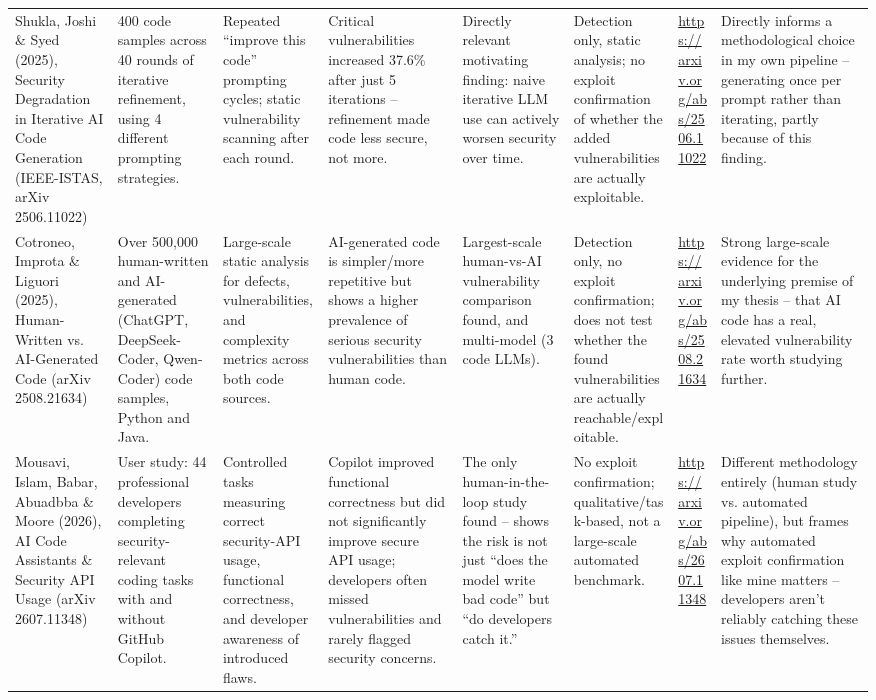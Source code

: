 \documentclass[10pt]{article}
\begin{document}
\begin{landscape}
\begin{longtable}{
  P{2.6cm}
  P{3.6cm}
  P{3.2cm}
  P{4.0cm}
  P{3.0cm}
  P{3.0cm}
  P{2.2cm}
  P{3.6cm}
}
Shukla, Joshi \& Syed (2025), Security Degradation in Iterative AI Code Generation (IEEE-ISTAS, arXiv 2506.11022)
&
400 code samples across 40 rounds of iterative refinement, using 4 different prompting strategies.
&
Repeated ``improve this code'' prompting cycles; static vulnerability scanning after each round.
&
Critical vulnerabilities increased 37.6\% after just 5 iterations -- refinement made code less secure, not more.
&
Directly relevant motivating finding: naive iterative LLM use can actively worsen security over time.
&
Detection only, static analysis; no exploit confirmation of whether the added vulnerabilities are actually exploitable.
&
\url{https://arxiv.org/abs/2506.11022}
&
Directly informs a methodological choice in my own pipeline -- generating once per prompt rather than iterating, partly because of this finding.
\\[4pt]

Cotroneo, Improta \& Liguori (2025), Human-Written vs. AI-Generated Code (arXiv 2508.21634)
&
Over 500{,}000 human-written and AI-generated (ChatGPT, DeepSeek-Coder, Qwen-Coder) code samples, Python and Java.
&
Large-scale static analysis for defects, vulnerabilities, and complexity metrics across both code sources.
&
AI-generated code is simpler/more repetitive but shows a higher prevalence of serious security vulnerabilities than human code.
&
Largest-scale human-vs-AI vulnerability comparison found, and multi-model (3 code LLMs).
&
Detection only, no exploit confirmation; does not test whether the found vulnerabilities are actually reachable/exploitable.
&
\url{https://arxiv.org/abs/2508.21634}
&
Strong large-scale evidence for the underlying premise of my thesis -- that AI code has a real, elevated vulnerability rate worth studying further.
\\[4pt]

Mousavi, Islam, Babar, Abuadbba \& Moore (2026), AI Code Assistants \& Security API Usage (arXiv 2607.11348)
&
User study: 44 professional developers completing security-relevant coding tasks with and without GitHub Copilot.
&
Controlled tasks measuring correct security-API usage, functional correctness, and developer awareness of introduced flaws.
&
Copilot improved functional correctness but did not significantly improve secure API usage; developers often missed vulnerabilities and rarely flagged security concerns.
&
The only human-in-the-loop study found -- shows the risk is not just ``does the model write bad code'' but ``do developers catch it.''
&
No exploit confirmation; qualitative/task-based, not a large-scale automated benchmark.
&
\url{https://arxiv.org/abs/2607.11348}
&
Different methodology entirely (human study vs. automated pipeline), but frames why automated exploit confirmation like mine matters -- developers aren't reliably catching these issues themselves.
\\


\end{longtable}
\end{landscape}
\end{document}
